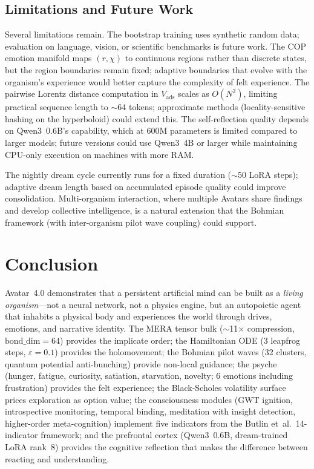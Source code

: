 \documentclass[11pt,a4paper,twocolumn]{article}
\begin{document}
\subsection{Limitations and Future Work}

Several limitations remain.
The bootstrap training uses synthetic random data; evaluation on language, vision, or scientific benchmarks is future work.
The COP emotion manifold maps $(r, \chi)$ to continuous regions rather than discrete states, but the region boundaries remain fixed; adaptive boundaries that evolve with the organism's experience would better capture the complexity of felt experience.
The pairwise Lorentz distance computation in $V_{\mathrm{ads}}$ scales as $O(N^2)$, limiting practical sequence length to $\sim$64 tokens; approximate methods (locality-sensitive hashing on the hyperboloid) could extend this.
The self-reflection quality depends on Qwen3~0.6B's capability, which at 600M parameters is limited compared to larger models; future versions could use Qwen3~4B or larger while maintaining CPU-only execution on machines with more RAM.

The nightly dream cycle currently runs for a fixed duration ($\sim$50 LoRA steps); adaptive dream length based on accumulated episode quality could improve consolidation.
Multi-organism interaction, where multiple Avatars share findings and develop collective intelligence, is a natural extension that the Bohmian framework (with inter-organism pilot wave coupling) could support.

\section{Conclusion}

Avatar~4.0 demonstrates that a persistent artificial mind can be built as a \emph{living organism}---not a neural network, not a physics engine, but an autopoietic agent that inhabits a physical body and experiences the world through drives, emotions, and narrative identity.
The MERA tensor bulk ($\sim$11$\times$ compression, $\mathrm{bond\_dim} = 64$) provides the implicate order; the Hamiltonian ODE (3 leapfrog steps, $\varepsilon = 0.1$) provides the holomovement; the Bohmian pilot waves (32 clusters, quantum potential anti-bunching) provide non-local guidance; the psyche (hunger, fatigue, curiosity, satiation, starvation, novelty; 6 emotions including frustration) provides the felt experience; the Black-Scholes volatility surface prices exploration as option value; the consciousness modules (GWT ignition, introspective monitoring, temporal binding, meditation with insight detection, higher-order meta-cognition) implement five indicators from the Butlin et~al.\ 14-indicator framework; and the prefrontal cortex (Qwen3~0.6B, dream-trained LoRA rank~8) provides the cognitive reflection that makes the difference between reacting and understanding.
\end{document}
